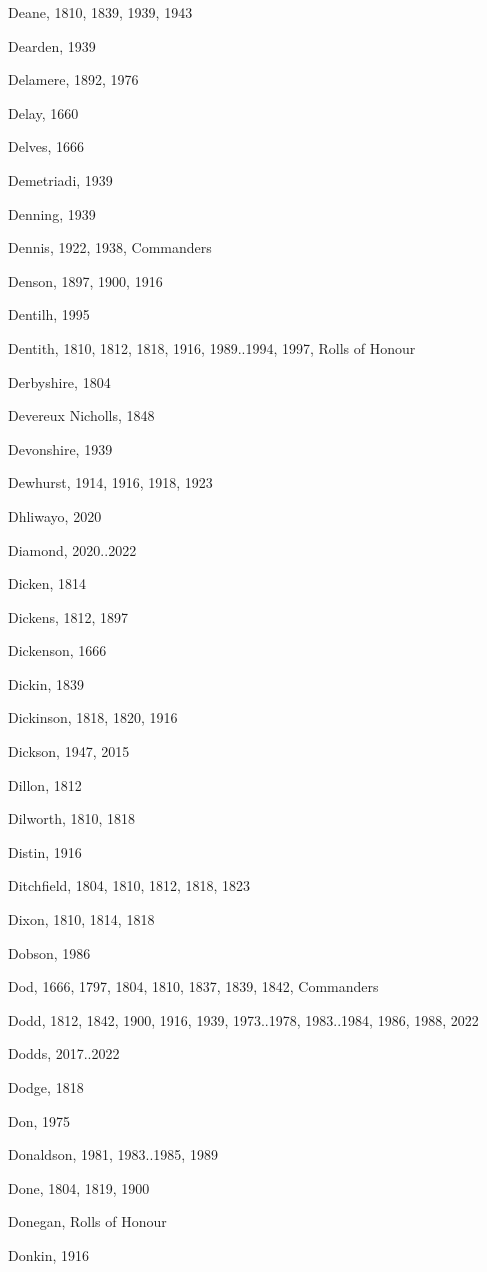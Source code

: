 {\begin{theindex}
\item Deane, 1810, 1839, 1939, 1943
\item Dearden, 1939
\item Delamere, 1892, 1976
\item Delay, 1660
\item Delves, 1666
\item Demetriadi, 1939
\item Denning, 1939
\item Dennis, 1922, 1938, Commanders
\item Denson, 1897, 1900, 1916
\item Dentilh, 1995
\item Dentith, 1810, 1812, 1818, 1916, 1989..1994, 1997, Rolls of Honour
\item Derbyshire, 1804
\item Devereux Nicholls, 1848
\item Devonshire, 1939
\item Dewhurst, 1914, 1916, 1918, 1923
\item Dhliwayo, 2020
\item Diamond, 2020..2022
\item Dicken, 1814
\item Dickens, 1812, 1897
\item Dickenson, 1666
\item Dickin, 1839
\item Dickinson, 1818, 1820, 1916
\item Dickson, 1947, 2015
\item Dillon, 1812
\item Dilworth, 1810, 1818
\item Distin, 1916
\item Ditchfield, 1804, 1810, 1812, 1818, 1823
\item Dixon, 1810, 1814, 1818
\item Dobson, 1986
\item Dod, 1666, 1797, 1804, 1810, 1837, 1839, 1842, Commanders
\item Dodd, 1812, 1842, 1900, 1916, 1939, 1973..1978, 1983..1984, 1986, 1988, 2022
\item Dodds, 2017..2022
\item Dodge, 1818
\item Don, 1975
\item Donaldson, 1981, 1983..1985, 1989
\item Done, 1804, 1819, 1900
\item Donegan, Rolls of Honour
\item Donkin, 1916

\end{theindex}}
